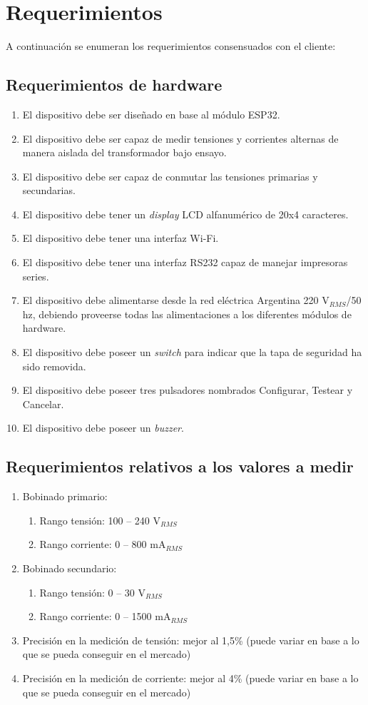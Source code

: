 \section{Requerimientos}

A continuación se enumeran los requerimientos consensuados con el cliente:

\subsection{Requerimientos de hardware}
	\begin{enumerate}
	\item El dispositivo debe ser diseñado en base al módulo ESP32.
	\item El dispositivo debe ser capaz de medir tensiones y corrientes alternas de manera aislada del transformador bajo ensayo.
	\item El dispositivo debe ser capaz de conmutar las tensiones primarias y secundarias.
	\item El dispositivo debe tener un \textit{display} LCD alfanumérico de 20x4 caracteres.
	\item El dispositivo debe tener una interfaz Wi-Fi.
	\item El dispositivo debe tener una interfaz RS232 capaz de manejar impresoras series.
	\item El dispositivo debe alimentarse desde la red eléctrica Argentina 220 V$_{RMS}$/50 hz, debiendo proveerse todas las alimentaciones a los diferentes módulos de hardware.
	\item El dispositivo debe poseer un \textit{switch} para indicar que la tapa de seguridad ha sido removida.
	\item El dispositivo debe poseer tres pulsadores nombrados Configurar, Testear y Cancelar.
	\item El dispositivo debe poseer un \textit{buzzer}.
	\end{enumerate}
\subsection{Requerimientos relativos a los valores a medir}
	\begin{enumerate}
	\item Bobinado primario:
		\begin{enumerate}
		\item Rango tensión: 100 – 240 V$_{RMS}$
		\item Rango corriente: 0 – 800 mA$_{RMS}$
		\end{enumerate}
	\item Bobinado secundario:
		\begin{enumerate}
		\item Rango tensión: 0 – 30 V$_{RMS}$
		\item Rango corriente: 0 – 1500 mA$_{RMS}$
		\end{enumerate}
	\item Precisión en la medición de tensión: mejor al 1,5\% (puede variar en base a lo que se pueda conseguir en el mercado)
	\item Precisión en la medición de corriente: mejor al 4\% (puede variar en base a lo que se pueda conseguir en el mercado)
	\end{enumerate}
